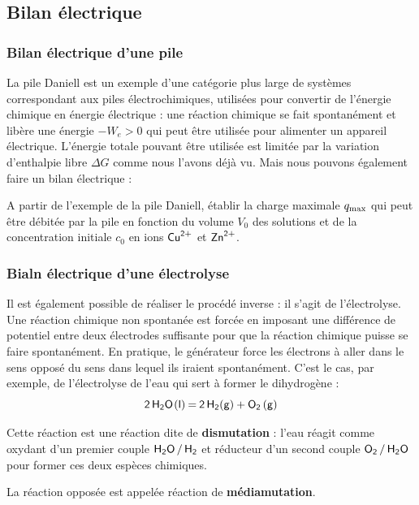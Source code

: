 \documentclass[11pt,fleqn]{book} %
\begin{document}
\subsection{Bilan électrique}

\subsubsection{Bilan électrique d'une pile}

La pile Daniell est un exemple d'une catégorie plus large de systèmes correspondant aux piles électrochimiques, utilisées pour convertir de l'énergie chimique en énergie électrique : une réaction chimique se fait spontanément et libère une énergie $-W_e >0$ qui peut être utilisée pour alimenter un appareil électrique. L'énergie totale pouvant être utilisée est limitée par la variation d'enthalpie libre $\Delta G$ comme nous l'avons déjà vu. Mais nous pouvons également faire un bilan électrique :
\begin{capex}
	A partir de l'exemple de la pile Daniell, établir la charge maximale $q_{\rm max}$ qui peut être débitée par la pile en fonction du volume $V_0$ des solutions et de la concentration initiale $c_0$ en ions $\ce{Cu^{2+}}$ et $\ce{Zn^{2+}}$. 
\end{capex}

\subsubsection{Bialn électrique d'une électrolyse}

Il est également possible de réaliser le procédé inverse : il s'agit de l'électrolyse. Une réaction chimique non spontanée est forcée en imposant une différence de potentiel entre deux électrodes suffisante pour que la réaction chimique puisse se faire spontanément. En pratique, le générateur force les électrons à aller dans le sens opposé du sens dans lequel ils iraient spontanément. C'est le cas, par exemple, de l'électrolyse de l'eau qui sert à former le dihydrogène :
\begin{equation}
	\ce{2 H2O(l) = 2 H2(g) + O2 (g)}
\end{equation}

\begin{remark}
	Cette réaction est une réaction dite de \textbf{dismutation} : l'eau réagit comme oxydant d'un premier couple $\ce{H2O / H2}$ et réducteur d'un second couple $\ce{O2 / H2O}$ pour former ces deux espèces chimiques.
	
	La réaction opposée est appelée réaction de \textbf{médiamutation}.
\end{remark}
\end{document}
